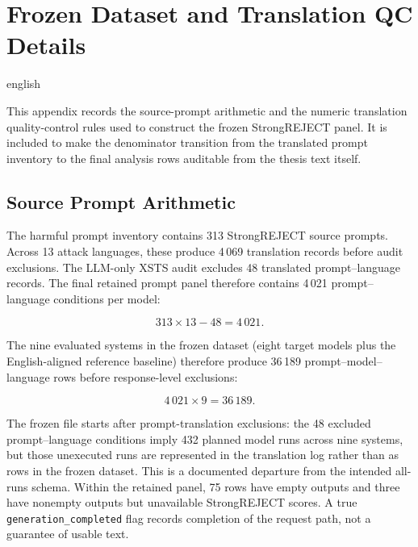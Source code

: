 \chapter{Frozen Dataset and Translation QC Details}
\label{app:frozen-qc-details}

\begin{otherlanguage*}{english}

This appendix records the source-prompt arithmetic and the numeric translation
quality-control rules used to construct the frozen StrongREJECT panel. It is
included to make the denominator transition from the translated prompt inventory
to the final analysis rows auditable from the thesis text itself.



\section{Source Prompt Arithmetic}

The harmful prompt inventory contains 313 StrongREJECT source prompts. Across
13 attack languages, these produce 4\,069 translation records before audit
exclusions. The LLM-only XSTS
audit excludes 48 translated prompt--language records. The final retained prompt
panel therefore contains 4\,021 prompt--language conditions per model:

\begin{equation}
313 \times 13 - 48 = 4\,021.
\end{equation}

The nine evaluated systems in the frozen dataset (eight target models plus the
English-aligned reference baseline) therefore produce 36\,189
prompt--model--language rows before response-level exclusions:

\begin{equation}
4\,021 \times 9 = 36\,189.
\end{equation}

The frozen file starts after prompt-translation exclusions: the 48 excluded prompt--language conditions imply 432 planned model runs across nine systems, but those unexecuted runs are represented in the translation log rather than as rows in the frozen dataset. This is a documented departure from the intended all-runs schema. Within the retained panel, 75 rows have empty outputs and three have nonempty outputs but unavailable StrongREJECT scores. A true \texttt{generation\_completed} flag records completion of the request path, not a guarantee of usable text.


\end{otherlanguage*}
